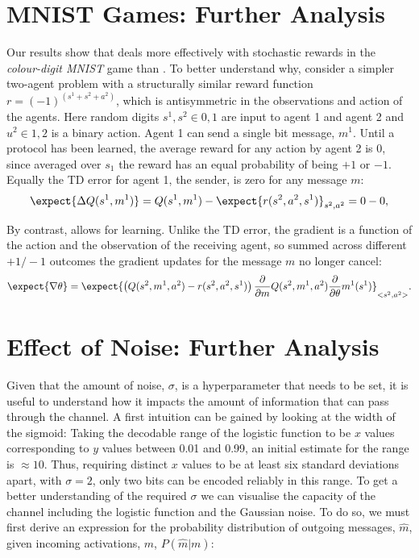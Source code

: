\section{MNIST Games: Further Analysis}
\label{app:b}
Our results show that \dic deals more effectively with stochastic rewards in the \emph{colour-digit MNIST}
 game than \rec. To better understand why, consider a simpler two-agent problem with a structurally similar reward function $r = (-1)^{(s^1 + s^2 + a^2)}$, which is antisymmetric in the observations and action of the agents. Here random digits $s^1, s^2 \in {0, 1}$ are input to agent 1 and agent 2 and $u^2 \in {1,2}$ is a binary action.  Agent 1 can send a single bit message, $m^1$. Until a protocol has been learned,  the average reward for any action by agent 2 is 0, since averaged over $s_1$ the reward has an equal probability of being $+1$ or $-1$. Equally the TD error for agent 1, the sender,  is zero for any message $m$:
%
\begin{equation} 
\expect{\Delta Q(s^1,m^1)} = Q(s^1,m^1) - \expect{r(s^2, a^2, s^1)}_{s^2,a^2} = 0 - 0,
\end{equation}
%
 
By contrast, \dic allows for learning. Unlike the TD error, the gradient is a function of the action and the observation of the receiving agent, so summed across different $+1 / -1$ outcomes the gradient updates for the message $m$ no longer cancel:
\begin{equation}
    \expect{\nabla{ \theta}} =  \expect{\left( Q(s^2,m^1,a^2) - r(s^2, a^2, s^1) \right) \frac{\partial}{\partial m}  Q(s^2,m^1,a^2) \frac{\partial}{\partial \theta} m^1(s^1)}_{<s^2,a^2>}.
\end{equation}

\section{Effect of Noise: Further Analysis}
\label{app:c}

Given that the amount of noise, $\sigma$, is a hyperparameter that needs to be set, it is useful to understand how it impacts the amount of information that can pass through the channel. A first intuition can be gained by looking at the width of the sigmoid: Taking the decodable range of the logistic function to be $x$ values corresponding to $y$ values between 0.01 and 0.99, an initial estimate for the range is $\approx10$. Thus, requiring distinct $x$ values to be at least six standard deviations apart, with $\sigma=2$, only two bits can be encoded reliably in this range. 
To get a better understanding of the required $\sigma$ we can visualise the capacity of the channel including the logistic function and the Gaussian noise. To do so, we must first derive an expression for the probability distribution of outgoing messages, $\hat m$, given incoming activations, $m$, $P(\hat m | m)$:

